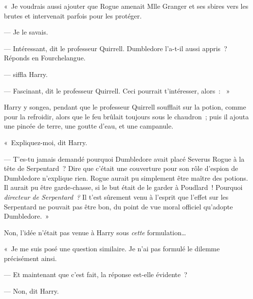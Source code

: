 «~Je voudrais aussi ajouter que Rogue amenait Mlle Granger et ses sbires vers les brutes et intervenait parfois pour les protéger.

--- Je le savais.

--- Intéressant, dit le professeur Quirrell.
Dumbledore l'a-t-il aussi appris~?
Réponds en Fourchelangue.

---  siffla Harry.

--- Fascinant, dit le professeur Quirrell.
Ceci pourrait t'intéresser, alors~: ~»

Harry y songea, pendant que le professeur Quirrell soufflait sur la potion, comme pour la refroidir, alors que le feu brûlait toujours sous le chaudron~; puis il ajouta une pincée de terre, une goutte d'eau, et une campanule.

«~Expliquez-moi, dit Harry.

--- T'es-tu jamais demandé pourquoi Dumbledore avait placé Severus Rogue à la tête de Serpentard~?
Dire que c'était une couverture pour son rôle d'espion de Dumbledore n'explique rien.
Rogue aurait pu simplement être maître des potions.
Il aurait pu être garde-chasse, si le but était de le garder à Poudlard~!
Pourquoi \emph{directeur de Serpentard~?} Il t'est sûrement venu à l'esprit que l'effet sur les Serpentard ne pouvait pas être bon, du point de vue moral officiel qu'adopte Dumbledore.~»

Non, l'idée n'était pas venue à Harry sous \emph{cette} formulation…

«~Je me suis posé une question similaire.
Je n'ai pas formulé le dilemme précisément ainsi.

--- Et maintenant que c'est fait, la réponse est-elle évidente~?

--- Non, dit Harry.

